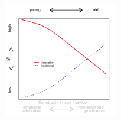 \documentclass[12pt, table]{beamer}
\begin{document}
\begin{frame}
\begin{minipage}[t]{\linewidth}
\begin{minipage}{.45\linewidth}
\end{minipage}
\hfill
\begin{minipage}{.45\linewidth}
\begin{figure}
\includegraphics[width=5cm]{images/LangChang12.png}
\end{figure}
\end{minipage}
\end{minipage}
\end{frame}
\end{document}
